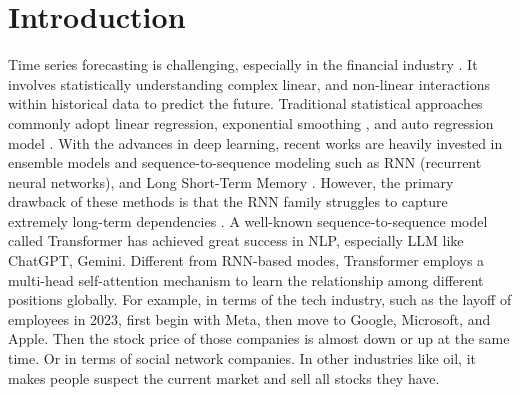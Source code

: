 \chapter{Introduction}
\label{ch:intro}

Time series forecasting is challenging, especially in the financial industry \cite{pedersen2019efficiently}. It involves statistically understanding complex linear, and non-linear interactions within historical data to predict the future. Traditional statistical approaches commonly adopt linear regression, exponential smoothing \cite{gardner1985forecasting}, and auto regression model \cite{SEMENOGLOU20211072}.
With the advances in deep learning, recent works are heavily invested in ensemble models and sequence-to-sequence modeling such as RNN (recurrent neural networks), and Long Short-Term Memory \cite{6795963}. However, the primary drawback of these methods is that the RNN family struggles to capture extremely long-term dependencies \cite{DBLP:journals/corr/abs-1907-00235}. A well-known sequence-to-sequence model called Transformer \cite{DBLP:journals/corr/VaswaniSPUJGKP17} has achieved great success in NLP, especially LLM like ChatGPT, Gemini. Different from RNN-based modes, Transformer employs a multi-head self-attention mechanism to learn the relationship among different positions globally. For example, in terms of the tech industry, such as the layoff of employees in 2023, first begin with Meta, then move to Google, Microsoft, and Apple. Then the stock price of those companies is almost down or up at the same time. Or in terms of social network companies. In other industries like oil, it makes people suspect the current market and sell all stocks they have.